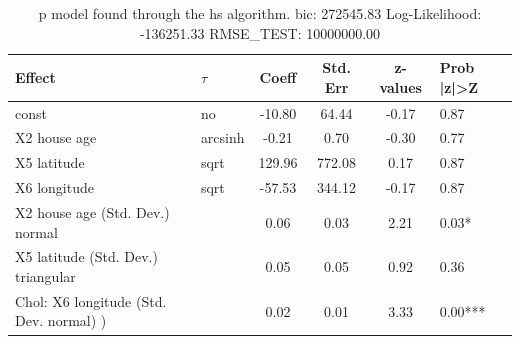 \begin{table}
	\caption{p model found through the hs algorithm. bic: 272545.83 Log-Likelihood: -136251.33 RMSE_TEST: 10000000.00}
	\begin{center}
		\begin{tabular}{|l|l|c|c|c|l|}
			\hline
			Effect & $\tau$ & Coeff & Std. Err & z-values & Prob |z|>Z \\
			\hline
			const & no & -10.80 & 64.44 & -0.17 & 0.87 \\
			\hline
			X2 house age & arcsinh & -0.21 & 0.70 & -0.30 & 0.77 \\
			\hline
			X5 latitude & sqrt & 129.96 & 772.08 & 0.17 & 0.87 \\
			\hline
			X6 longitude & sqrt & -57.53 & 344.12 & -0.17 & 0.87 \\
			\hline
			X2 house age (Std. Dev.) normal &  & 0.06 & 0.03 & 2.21 & 0.03* \\
			\hline
			X5 latitude (Std. Dev.) triangular &  & 0.05 & 0.05 & 0.92 & 0.36 \\
			\hline
			 Chol: X6 longitude (Std. Dev. normal) ) &  & 0.02 & 0.01 & 3.33 & 0.00*** \\
			\hline
		\end{tabular}
	\end{center}
\end{table}